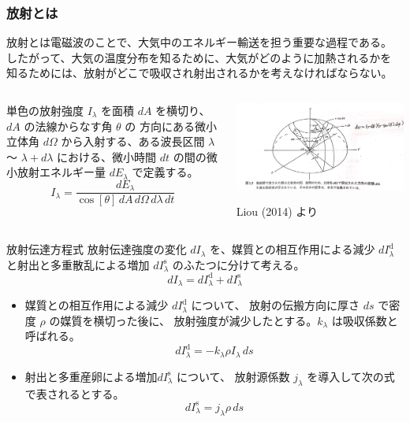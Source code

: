 \documentclass[unicode,colorlinks]{beamer}
\newcommand{\centeralign}[1]{\rule{0pt}{0pt}\hfill#1\hfill\rule{0pt}{0pt}}
\begin{document}
\begin{frame}
	\frametitle{放射とは}
	放射とは電磁波のことで、大気中のエネルギー輸送を担う重要な過程である。
	したがって、大気の温度分布を知るために、大気がどのように加熱されるかを
	知るためには、放射がどこで吸収され射出されるかを考えなければならない。

	\hfill

	\begin{columns}
		\begin{column}{0.6\textwidth}
			単色の放射強度 $I_\lambda$ を面積 $dA$ を横切り、$dA$ の法線からなす角 $\theta$ の
			方向にある微小立体角 $d\Omega$ から入射する、ある波長区間 $\lambda$ 〜 $\lambda+d\lambda$
			における、微小時間 $dt$ の間の微小放射エネルギー量 $dE_\lambda$ で定義する。
			\[I_\lambda=\frac{dE_\lambda}{\cos[\theta]\,dA\,d\Omega\,d\lambda\,dt}\]
		\end{column}
		\begin{column}{0.4\textwidth}
			\centeralign{\includegraphics[width=\textwidth]{eq.jpg}}
			\centeralign{\tiny Liou (2014) より}
		\end{column}
	\end{columns}
\end{frame}

\begin{frame}{放射伝達方程式}
	放射伝達強度の変化 $dI_\lambda$ を、媒質との相互作用による減少
	$dI_\lambda^\mathrm{d}$ と射出と多重散乱による増加 $dI_\lambda^\mathrm{s}$
	のふたつに分けて考える。
	\[dI_\lambda=dI_\lambda^\mathrm{d}+dI_\lambda^\mathrm{s}\]

	\begin{itemize}
		\item 媒質との相互作用による減少 $dI_\lambda^\mathrm{d}$ について、
			放射の伝搬方向に厚さ $ds$ で密度 $\rho$ の媒質を横切った後に、
			放射強度が減少したとする。$k_\lambda$ は吸収係数と呼ばれる。
			\[dI_\lambda^\mathrm{d}=-k_\lambda\rho I_\lambda\,ds\]
		\item 射出と多重産卵による増加$dI_\lambda^\mathrm{s}$ について、
			放射源係数 $j_\lambda$ を導入して次の式で表されるとする。
			\[dI_\lambda^\mathrm{s}=j_\lambda\rho\,ds\]
	\end{itemize}
\end{frame}
\end{document}
